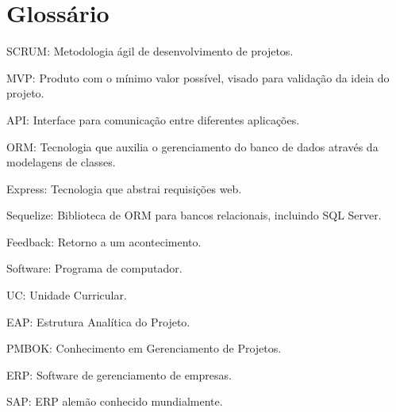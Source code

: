 \section{Glossário}
SCRUM:		Metodologia ágil de desenvolvimento de projetos.

MVP:		Produto com o mínimo valor possível, visado para validação da ideia do projeto.

API:		Interface para comunicação entre diferentes aplicações.

ORM:		Tecnologia que auxilia o gerenciamento do banco de dados através da modelagens de classes.

Express:	Tecnologia que abstrai requisições web.

Sequelize:	Biblioteca de ORM para bancos relacionais, incluindo SQL Server.

Feedback:	Retorno a um acontecimento.

Software:	Programa de computador.

UC:			Unidade Curricular.

EAP:		Estrutura Analítica do Projeto.

PMBOK:      Conhecimento em Gerenciamento de Projetos.

ERP:        Software de gerenciamento de empresas.

SAP:        ERP alemão conhecido mundialmente.






